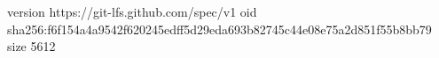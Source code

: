 version https://git-lfs.github.com/spec/v1
oid sha256:f6f154a4a9542f620245edff5d29eda693b82745c44e08e75a2d851f55b8bb79
size 5612

